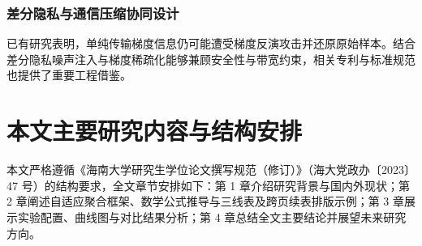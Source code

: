 \subsubsection{差分隐私与通信压缩协同设计}

已有研究表明，单纯传输梯度信息仍可能遭受梯度反演攻击并还原原始样本\cite{mahuan2011}。结合差分隐私噪声注入与梯度稀疏化能够兼顾安全性与带宽约束，相关专利与标准规范也提供了重要工程借鉴\cite{jiangxizhou1989,dublincore2012}。

\section{本文主要研究内容与结构安排}

本文严格遵循《海南大学研究生学位论文撰写规范（修订）》（海大党政办〔2023〕47 号）的结构要求，全文章节安排如下：第 1 章介绍研究背景与国内外现状；第 2 章阐述自适应聚合框架、数学公式推导与三线表及跨页续表排版示例；第 3 章展示实验配置、曲线图与对比结果分析；第 4 章总结全文主要结论并展望未来研究方向。
